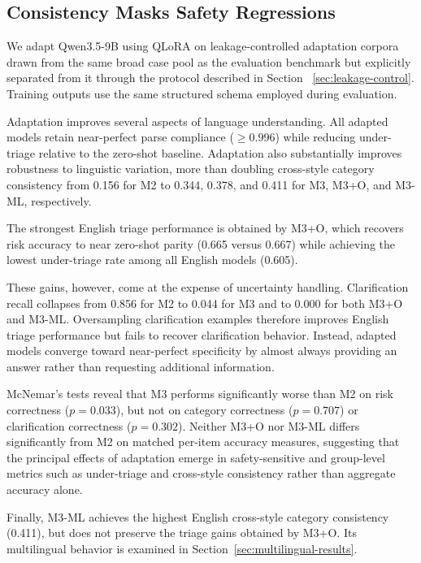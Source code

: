 \subsection{Consistency Masks Safety Regressions}

We adapt Qwen3.5-9B using QLoRA on leakage-controlled adaptation corpora drawn from the same broad case pool as the evaluation benchmark but explicitly separated from it through the protocol described in Section ~\ref{sec:leakage-control}. Training outputs use the same structured schema employed during evaluation.

Adaptation improves several aspects of language understanding. All adapted models retain near-perfect parse compliance ($\geq 0.996$) while reducing under-triage relative to the zero-shot baseline. Adaptation also substantially improves robustness to linguistic variation, more than doubling cross-style category consistency from 0.156 for M2 to 0.344, 0.378, and 0.411 for M3, M3+O, and M3-ML, respectively.

The strongest English triage performance is obtained by M3+O, which recovers risk accuracy to near zero-shot parity (0.665 versus 0.667) while achieving the lowest under-triage rate among all English models (0.605).

These gains, however, come at the expense of uncertainty handling. Clarification recall collapses from 0.856 for M2 to 0.044 for M3 and to 0.000 for both M3+O and M3-ML. Oversampling clarification examples therefore improves English triage performance but fails to recover clarification behavior. Instead, adapted models converge toward near-perfect specificity by almost always providing an answer rather than requesting additional information.

McNemar's tests reveal that M3 performs significantly worse than M2 on risk correctness ($p=0.033$), but not on category correctness ($p=0.707$) or clarification correctness ($p=0.302$). Neither M3+O nor M3-ML differs significantly from M2 on matched per-item accuracy measures, suggesting that the principal effects of adaptation emerge in safety-sensitive and group-level metrics such as under-triage and cross-style consistency rather than aggregate accuracy alone.

Finally, M3-ML achieves the highest English cross-style category consistency (0.411), but does not preserve the triage gains obtained by M3+O. Its multilingual behavior is examined in Section~\ref{sec:multilingual-results}.



